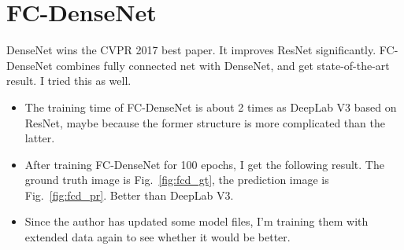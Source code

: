 \documentclass[]{IEEEtran}
\begin{document}
\section{FC-DenseNet}
	DenseNet wins the CVPR 2017 best paper. It improves ResNet significantly. FC-DenseNet combines fully connected net with DenseNet, and get state-of-the-art result. I tried this as well.
	\begin{itemize}
		\item The training time of FC-DenseNet is about 2 times as DeepLab V3 based on ResNet, maybe because the former structure is more complicated than the latter.
		\item After training FC-DenseNet for 100 epochs, I get the following result. The ground truth image is Fig.~\ref{fig:fcd_gt}, the prediction image is Fig.~\ref{fig:fcd_pr}. Better than DeepLab V3.
		\item Since the author has updated some model files, I'm training them with extended data again to see whether it would be better.
	\end{itemize}
\newpage
\end{document}
